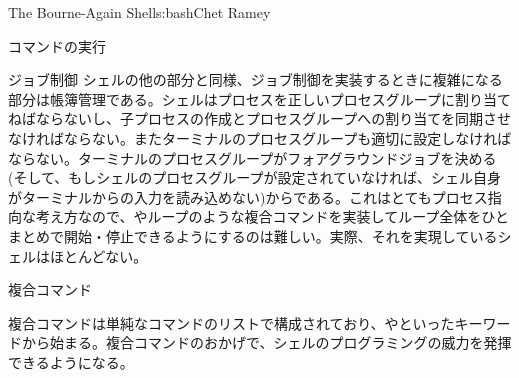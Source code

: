 \begin{aosachapter}{The Bourne-Again Shell}{s:bash}{Chet Ramey}
\begin{aosasect1}{コマンドの実行}
\begin{aosasect2}{ジョブ制御}
シェルの他の部分と同様、ジョブ制御を実装するときに複雑になる部分は帳簿管理である。シェルはプロセスを正しいプロセスグループに割り当てねばならないし、子プロセスの作成とプロセスグループへの割り当てを同期させなければならない。またターミナルのプロセスグループも適切に設定しなければならない。ターミナルのプロセスグループがフォアグラウンドジョブを決める(そして、もしシェルのプロセスグループが設定されていなければ、シェル自身がターミナルからの入力を読み込めない)からである。これはとてもプロセス指向な考え方なので、やループのような複合コマンドを実装してループ全体をひとまとめで開始・停止できるようにするのは難しい。実際、それを実現しているシェルはほとんどない。

\end{aosasect2}

\begin{aosasect2}{複合コマンド}

複合コマンドは単純なコマンドのリストで構成されており、やといったキーワードから始まる。複合コマンドのおかげで、シェルのプログラミングの威力を発揮できるようになる。


\end{aosasect2}
\end{aosasect1}
\end{aosachapter}
